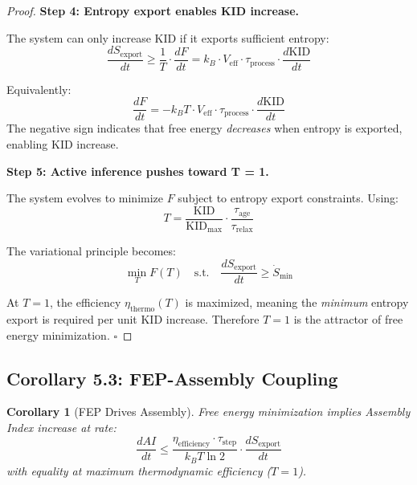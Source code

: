 \documentclass[11pt,a4paper]{article}
\newtheorem{corollary}[theorem]{Corollary}
\begin{document}
\begin{proof}
\textbf{Step 4: Entropy export enables KID increase.}

The system can only increase KID if it exports sufficient entropy:
\begin{equation}
\frac{dS_{\text{export}}}{dt} \geq \frac{1}{T} \cdot \frac{dF}{dt} = k_B \cdot V_{\text{eff}} \cdot \tau_{\text{process}} \cdot \frac{d\text{KID}}{dt}
\end{equation}

Equivalently:
\begin{equation}
\boxed{\frac{dF}{dt} = -k_B T \cdot V_{\text{eff}} \cdot \tau_{\text{process}} \cdot \frac{d\text{KID}}{dt}}
\end{equation}
The negative sign indicates that free energy \emph{decreases} when entropy is exported, enabling KID increase.

\textbf{Step 5: Active inference pushes toward T = 1.}

The system evolves to minimize $F$ subject to entropy export constraints. Using:
\begin{equation}
T = \frac{\text{KID}}{\text{KID}_{\max}} \cdot \frac{\tau_{\text{age}}}{\tau_{\text{relax}}}
\end{equation}

The variational principle becomes:
\begin{equation}
\min_T F(T) \quad \text{s.t.} \quad \frac{dS_{\text{export}}}{dt} \geq \dot{S}_{\min}
\end{equation}

At $T = 1$, the efficiency $\eta_{\text{thermo}}(T)$ is maximized, meaning the \emph{minimum} entropy export is required per unit KID increase. Therefore $T = 1$ is the attractor of free energy minimization.
\hfill $\square$
\end{proof}

\subsection{Corollary 5.3: FEP-Assembly Coupling}

\begin{corollary}[FEP Drives Assembly]
Free energy minimization implies Assembly Index increase at rate:
\begin{equation}
\frac{dAI}{dt} \leq \frac{\eta_{\text{efficiency}} \cdot \tau_{\text{step}}}{k_B T \ln 2} \cdot \frac{dS_{\text{export}}}{dt}
\end{equation}
with equality at maximum thermodynamic efficiency ($T = 1$).
\end{corollary}
\end{document}
